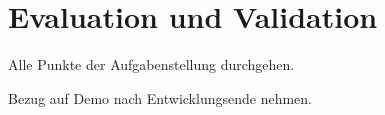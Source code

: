 \chapter{Evaluation und Validation}
Alle Punkte der Aufgabenstellung durchgehen.

Bezug auf Demo nach Entwicklungsende nehmen.

